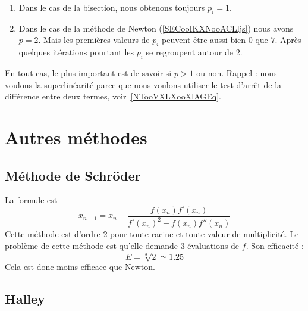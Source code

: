 \begin{enumerate}
	\item
	      Dans le cas de la bisection, nous obtenons toujours \( p_i=1\).
	\item
	      Dans le cas de la méthode de Newton (\ref{SECooIKXNooACLljs}) nous avons \( p=2\). Mais les premières valeurs de \( p_i\) peuvent être aussi bien \( 0\) que \( 7\). Après quelques itérations pourtant les \( p_i\) se regroupent autour de \( 2\).
\end{enumerate}
En tout cas, le plus important est de savoir si \( p>1\) ou non. Rappel : nous voulons la superlinéarité parce que nous voulons utiliser le test d'arrêt de la différence entre deux termes, voir~\ref{NTooVXLXooXlAGEq}.

\section{Autres méthodes}

\subsection{Méthode de Schröder}

La formule est
\begin{equation}
	x_{n+1}=x_n-\frac{ f(x_n)f'(x_n) }{ f'(x_n)^2-f(x_n)f''(x_n) }
\end{equation}
Cette méthode est d'ordre \( 2\) pour toute racine et toute valeur de multiplicité. Le problème de cette méthode est qu'elle demande \( 3\) évaluations de \( f\). Son efficacité :
\begin{equation}
	E=\sqrt[3]{ 2 }\simeq 1.25
\end{equation}
Cela est donc moins efficace que Newton.

\subsection{Halley}

